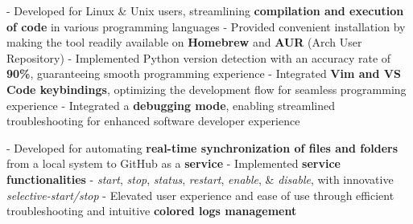 \documentclass[a4paper,10pt]{extarticle} %
\begin{document}
\begin{description}[style=nextline, font=$\bullet$\hspace{2mm}\normalsize]


 \item[{\href{https://github.com/proffapt/code-runner}{Code Runner}} | Bash, Vim, VSCode] 
- Developed for Linux \& Unix users, streamlining \textbf{compilation and execution of code} in various programming languages \newline
- Provided convenient installation by making the tool readily available on \textbf{Homebrew} and \textbf{AUR} (Arch User Repository) \newline
- Implemented Python version detection with an accuracy rate of \textbf{90\%}, guaranteeing smooth programming experience \newline
- Integrated \textbf{Vim and VS Code keybindings}, optimizing the development flow for seamless programming experience \newline
- Integrated a \textbf{debugging mode}, enabling streamlined troubleshooting for enhanced software developer experience 

 \item[{\href{https://github.com/proffapt/gsync}{GSYNC}} | Bash, Linux Uitilities] 
- Developed for automating \textbf{real-time synchronization of files and folders} from a local system to GitHub as a \textbf{service} \newline
- Implemented \textbf{service functionalities} - \textit{start}, \textit{stop}, \textit{status}, \textit{restart}, \textit{enable}, \& \textit{disable}, with innovative \textit{selective-start/stop} \newline
- Elevated user experience and ease of use through efficient troubleshooting and intuitive \textbf{colored logs management}
 
\end{description}
\end{document}
